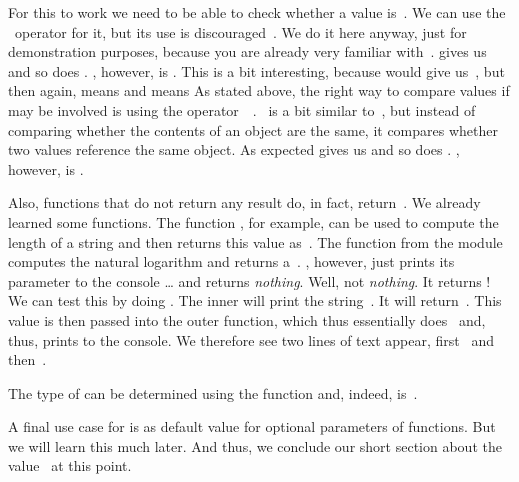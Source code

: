 For this to work we need to be able to check whether a value is~.
We can use the \pythonilIdx{==}~operator for it, but its use is discouraged~\cite{PEP8}.
We do it here anyway, just for demonstration purposes, because you are already very familiar with~\pythonil{==}.
 gives us  and so does .
, however, is .
This is a bit interesting, because  would give us~, but then again,  means  and  means %
%
%
%
As stated above, the right way to compare values if  may be involved is using the operator~~\cite{PEP8}.
~is a bit similar to~\pythonilIdx{==}, but instead of comparing whether the contents of an object are the same, it compares whether two values reference the same object.
As expected  gives us  and so does .
, however, is .

Also, functions that do not return any result do, in fact, return~.
We already learned some functions.
The function , for example, can be used to compute the length of a string and then returns this value as~.
The function  from the  module computes the natural logarithm and returns a~.
, however, just prints its parameter to the console {\dots} and returns \emph{nothing}.
Well, not \emph{nothing}.
It returns !
We can test this by doing .
The inner  will print the string~.
It will return~.
This value  is then passed into the outer  function, which thus essentially does~ and, thus, prints  to the console.
We therefore see two lines of text appear, first~ and then~.

The type of  can be determined using the  function and, indeed, is~.

A final use case for  is as default value for optional parameters of functions.
But we will learn this much later.
And thus, we conclude our short section about the value~ at this point.%
%
\FloatBarrier%
\endhsection%
%
